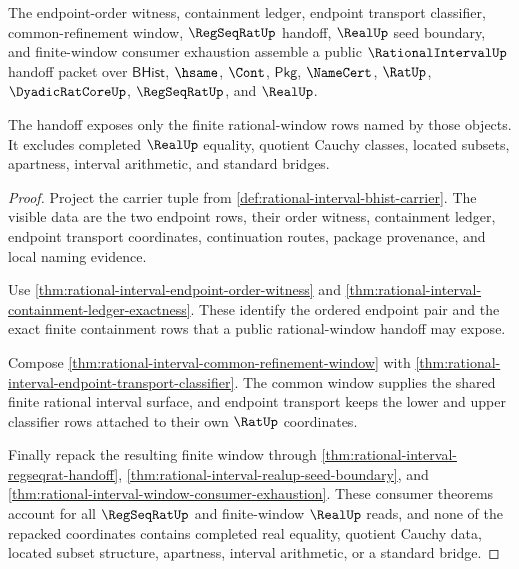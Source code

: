 \begin{theorem}
\label{thm:rational-interval-public-rational-window-handoff}
The endpoint-order witness, containment ledger, endpoint transport classifier,
common-refinement window, $\RegSeqRatUp$ handoff, $\RealUp$ seed boundary, and
finite-window consumer exhaustion assemble a public $\RationalIntervalUp$
handoff packet over $\mathsf{BHist}$, $\hsame$, $\Cont$, $\mathsf{Pkg}$,
$\NameCert$, $\RatUp$, $\DyadicRatCoreUp$, $\RegSeqRatUp$, and $\RealUp$.

The handoff exposes only the finite rational-window rows named by those
objects. It excludes completed $\RealUp$ equality, quotient Cauchy classes,
located subsets, apartness, interval arithmetic, and standard bridges.
\end{theorem}
\begin{proof}
Project the carrier tuple from
\autoref{def:rational-interval-bhist-carrier}. The visible data are the two
endpoint rows, their order witness, containment ledger, endpoint transport
coordinates, continuation routes, package provenance, and local naming
evidence.

Use \autoref{thm:rational-interval-endpoint-order-witness} and
\autoref{thm:rational-interval-containment-ledger-exactness}. These identify the
ordered endpoint pair and the exact finite containment rows that a public
rational-window handoff may expose.

Compose \autoref{thm:rational-interval-common-refinement-window} with
\autoref{thm:rational-interval-endpoint-transport-classifier}. The common
window supplies the shared finite rational interval surface, and endpoint
transport keeps the lower and upper classifier rows attached to their own
$\RatUp$ coordinates.

Finally repack the resulting finite window through
\autoref{thm:rational-interval-regseqrat-handoff},
\autoref{thm:rational-interval-realup-seed-boundary}, and
\autoref{thm:rational-interval-window-consumer-exhaustion}. These consumer
theorems account for all $\RegSeqRatUp$ and finite-window $\RealUp$ reads, and
none of the repacked coordinates contains completed real equality, quotient
Cauchy data, located subset structure, apartness, interval arithmetic, or a
standard bridge.
\end{proof}

